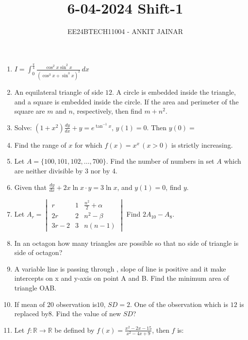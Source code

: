 \documentclass[journal,12pt,onecolumn]{IEEEtran}
\theoremstyle{remark}
\begin{document}

\vspace{3cm}

\title{\textbf{6-04-2024 Shift-1}}
\author{EE24BTECH11004 - ANKIT JAINAR}
\maketitle
\bigskip

\renewcommand{\thefigure}{\theenumi}
\renewcommand{\thetable}{\theenumi}
\setlength{\columnsep}{2.5em}
\begin{enumerate}
\item $I = \int_{0}^{\frac{\pi}{4}} \frac{\cos^2 x \sin^2 x}{\left( \cos^3 x + \sin^3 x \right)^2} \, dx$
\item An equilateral triangle of side $12$. A circle is embedded inside the triangle, and a square is embedded inside the circle. If the area and perimeter of the square are $m$ and $n$, respectively, then find $m + n^2$.
\item Solve: $\left(1 + x^2 \right) \frac{dy}{dx} + y = e^{\tan^{-1}x}, \, y(1) = 0$. Then $y(0) =$
\item Find the range of $x$ for which $f(x) = x^x \, (x > 0)$ is strictly increasing.
\item Let $A = \{100, 101, 102, \dots, 700\}$. Find the number of numbers in set $A$ which are neither divisible by 3 nor by 4.
\item Given that $\frac{dy}{dx} + 2x \ln{x} \cdot y = 3 \ln{x}$, and $y(1) = 0$, find $y$.
\item Let 
$A_r = \begin{vmatrix}
r & 1 & \frac{n^2}{2} + \alpha \\
2r & 2 & n^2 - \beta \\
3r - 2 & 3 & n(n-1)
\end{vmatrix}$
Find $2A_{10} - A_8$.
\item In an octagon how many triangles are possible so that no side of triangle is side of octagon?
\item A variable line is passing through , slope of line is positive and it make intercepts on
x and y-axis on point A and B. Find the minimum area of triangle OAB.
\item If mean of $20$ observation is$ 10$, $SD = 2$. One of the observation which is $12$ is replaced by$ 8$.
Find the value of new $SD$?
\item Let $f : \mathbb{R} \to \mathbb{R}$ be defined by $f(x) = \frac{x^2 - 2x - 15}{x^2 - 4x + 9}$, then $f$ is:
    \begin{enumerate}

\end{enumerate}
\end{enumerate}
\end{document}
